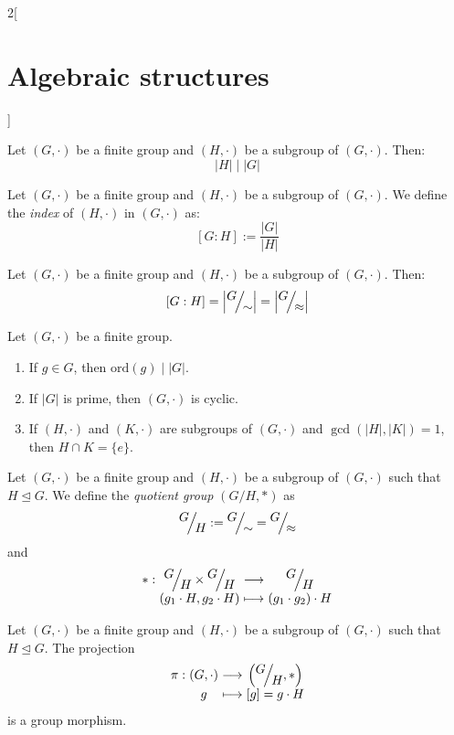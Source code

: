 \documentclass[../../../main_math.tex]{subfiles}
\begin{document}
\begin{multicols}{2}[\section{Algebraic structures}]
\begin{theorem}
    Let $(G,\cdot)$ be a finite group and $(H,\cdot)$ be a subgroup of $(G,\cdot)$. Then: $$|H|\mid|G|$$
  \end{theorem}
  \begin{definition}
    Let $(G,\cdot)$ be a finite group and $(H,\cdot)$ be a subgroup of $(G,\cdot)$. We define the \emph{index} of $(H,\cdot)$ in $(G,\cdot)$ as: $$[G:H]:=\frac{|G|}{|H|}$$
  \end{definition}
  \begin{corollary}
    Let $(G,\cdot)$ be a finite group and $(H,\cdot)$ be a subgroup of $(G,\cdot)$. Then: $$[G:H]=\left|\quot{G}{\sim}\right|=\left|\quot{G}{\approx}\right|$$
  \end{corollary}
  \begin{corollary}
    Let $(G,\cdot)$ be a finite group.
    \begin{enumerate}
      \item If $g\in G$, then $\text{ord}(g)\mid |G|$.
      \item If $|G|$ is prime, then $(G,\cdot)$ is cyclic.
      \item If $(H,\cdot)$ and $(K,\cdot)$ are subgroups of $(G,\cdot)$ and $\gcd(|H|,|K|)=1$, then $H\cap K=\{e\}$.
    \end{enumerate}
  \end{corollary}
  \begin{definition}
    Let $(G,\cdot)$ be a finite group and $(H,\cdot)$ be a subgroup of $(G,\cdot)$ such that $H\unlhd G$. We define the \emph{quotient group} $\left(G/H,*\right)$ as $$\quot{G}{H}:=\quot{G}{\sim}=\quot{G}{\approx}$$ and
    $$\function{*}{\displaystyle\quot{G}{H}\times\quot{G}{H}}{\displaystyle\quot{G}{H}}{(g_1\cdot H,g_2\cdot H)}{(g_1\cdot g_2)\cdot H}$$
  \end{definition}
  \begin{lemma}
    Let $(G,\cdot)$ be a finite group and $(H,\cdot)$ be a subgroup of $(G,\cdot)$ such that $H\unlhd G$. The projection
    $$\function{\pi}{(G,\cdot)}{\displaystyle\left(\quot{G}{H},*\right)}{g}{[g]=g\cdot H}$$
    is a group morphism.
  \end{lemma}

\end{multicols}
\end{document}
